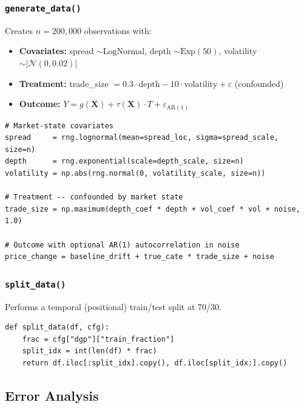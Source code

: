 \documentclass[11pt, letterpaper]{article}
\begin{document}
\subsubsection{\texttt{generate\_data()}}
Creates $n = 200{,}000$ observations with:
\begin{itemize}[leftmargin=2em]
    \item \textbf{Covariates:} spread $\sim \text{LogNormal}$, depth $\sim \text{Exp}(50)$, volatility $\sim |\mathcal{N}(0, 0.02)|$
    \item \textbf{Treatment:} trade\_size $= 0.3 \cdot \text{depth} - 10 \cdot \text{volatility} + \varepsilon$ (confounded)
    \item \textbf{Outcome:} $Y = g(\mathbf{X}) + \tau(\mathbf{X}) \cdot T + \varepsilon_{\text{AR}(1)}$
\end{itemize}

\begin{lstlisting}[caption={Core data generation logic (abbreviated).}]
# Market-state covariates
spread     = rng.lognormal(mean=spread_loc, sigma=spread_scale, size=n)
depth      = rng.exponential(scale=depth_scale, size=n)
volatility = np.abs(rng.normal(0, volatility_scale, size=n))

# Treatment -- confounded by market state
trade_size = np.maximum(depth_coef * depth + vol_coef * vol + noise, 1.0)

# Outcome with optional AR(1) autocorrelation in noise
price_change = baseline_drift + true_cate * trade_size + noise
\end{lstlisting}

\subsubsection{\texttt{split\_data()}}
Performs a temporal (positional) train/test split at 70/30.

\begin{lstlisting}[caption={Train/test split.}]
def split_data(df, cfg):
    frac = cfg["dgp"]["train_fraction"]
    split_idx = int(len(df) * frac)
    return df.iloc[:split_idx].copy(), df.iloc[split_idx:].copy()
\end{lstlisting}

\subsection{Error Analysis}
\end{document}
